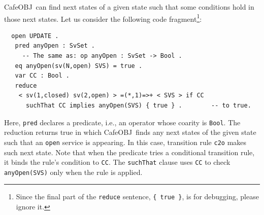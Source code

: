 \documentclass[12pt]{report}
\newcommand{\stt}[1]{{\small{\tt {#1}}}}
\newcommand{\cafeobj}{{\sf CafeOBJ}~}
\begin{document}
\cafeobj can find next states of a given state such that some
conditions hold in those next states. Let us consider the following
code fragment\footnote{Since the final part of the {\tt reduce} sentence,
  {\tt \{~true~\}}, is for debugging, please ignore it.}:
\begin{verbatim}
  open UPDATE .
   pred anyOpen : SvSet .
     -- The same as: op anyOpen : SvSet -> Bool .
   eq anyOpen(sv(N,open) SVS) = true .
   var CC : Bool .
   reduce 
    < sv(1,closed) sv(2,open) > =(*,1)=>+ < SVS > if CC
      suchThat CC implies anyOpen(SVS) { true } .        -- to true.
\end{verbatim}
Here, {\tt pred} declares a predicate, i.e., an operator whose coarity
is {\tt Bool}.  The reduction returns true in which \cafeobj finds any
next states of the given state such that an {\tt open} service is
appearing. In this case, transition rule {\tt c2o} makes such next
state.  Note that when the predicate tries a conditional transition
rule, it binds the rule's condition to {\tt CC}. The {\tt suchThat}
clause uses {\tt CC} to check \stt{anyOpen(SVS)} only when the rule is
applied.
\end{document}

